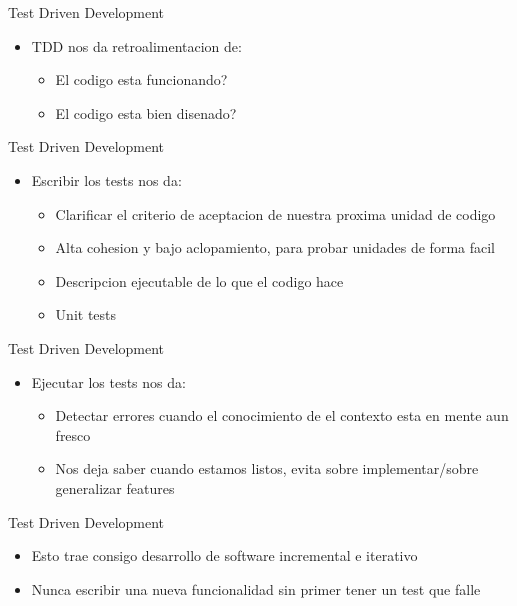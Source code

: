 \begin{frame}{Test Driven Development} 
    \begin{itemize}
        \item TDD nos da retroalimentacion de:
        \begin{itemize}
            \item El codigo esta funcionando?
            \item El codigo esta bien disenado?
        \end{itemize}
    \end{itemize}
\end{frame}

\begin{frame}{Test Driven Development} 
    \begin{itemize}
        \item Escribir los tests nos da:
        \begin{itemize}
            \item Clarificar el criterio de aceptacion de nuestra proxima unidad de codigo
            \item Alta cohesion y bajo aclopamiento, para probar unidades de forma facil
            \item Descripcion ejecutable de lo que el codigo hace
            \item Unit tests
        \end{itemize}
    \end{itemize}
\end{frame}

\begin{frame}{Test Driven Development} 
    \begin{itemize}
        \item Ejecutar los tests nos da:
        \begin{itemize}
            \item Detectar errores cuando el conocimiento de el contexto esta en mente aun fresco
            \item Nos deja saber cuando estamos listos, evita sobre implementar/sobre generalizar features
        \end{itemize}
    \end{itemize}
\end{frame}

\begin{frame}{Test Driven Development} 
    \begin{itemize}
        \item Esto trae consigo desarrollo de software incremental e iterativo
    \end{itemize}
    \begin{itemize}
        \item Nunca escribir una nueva funcionalidad sin primer tener un test que falle
    \end{itemize}
\end{frame}


